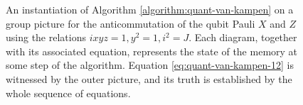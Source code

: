 \begin{figure}


\caption{An instantiation of Algorithm \ref{algorithm:quant-van-kampen} on a group picture for the anticommutation of the qubit Pauli $X$ and $Z$ using the relations $ixyz = 1, y^2 = 1, i^2 = J$. 
Each diagram, together with its associated equation, represents the state of the memory at some step of the algorithm. Equation \eqref{eq:quant-van-kampen-12} is witnessed by the outer picture, and its truth is established by the whole sequence of equations.}


\end{figure}
